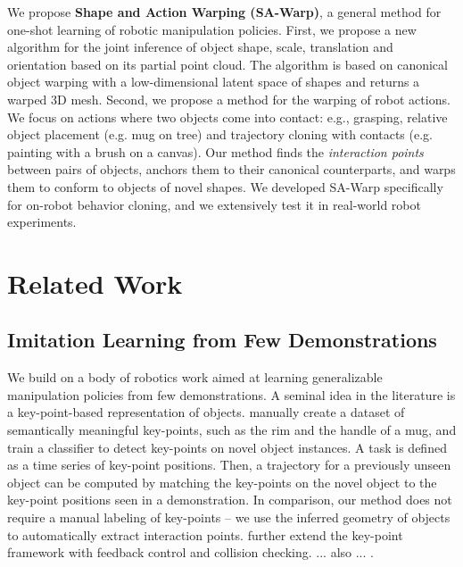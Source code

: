 \documentclass{article}
\begin{document}
We propose \textbf{Shape and Action Warping (SA-Warp)}, a general method for one-shot learning of robotic manipulation policies. First, we propose a new algorithm for the joint inference of object shape, scale, translation and orientation based on its partial point cloud. The algorithm is based on canonical object warping with a low-dimensional latent space of shapes \cite{rodriguez18transferring,thompson21shapebased} and returns a warped 3D mesh. Second, we propose a method for the warping of robot actions. We focus on actions where two objects come into contact: e.g., grasping, relative object placement (e.g. mug on tree) and trajectory cloning with contacts (e.g. painting with a brush on a canvas). Our method finds the \textit{interaction points} between pairs of objects, anchors them to their canonical counterparts, and warps them to conform to objects of novel shapes. We developed SA-Warp specifically for on-robot behavior cloning, and we extensively test it in real-world robot experiments.

\section{Related Work}

\subsection{Imitation Learning from Few Demonstrations} 

We build on a body of robotics work aimed at learning generalizable manipulation policies from few demonstrations. A seminal idea in the literature is a key-point-based representation of objects. \citet{manuelli19kpam} manually create a dataset of semantically meaningful key-points, such as the rim and the handle of a mug, and train a classifier to detect key-points on novel object instances. A task is defined as a time series of key-point positions. Then, a trajectory for a previously unseen object can be computed by matching the key-points on the novel object to the key-point positions seen in a demonstration. In comparison, our method does not require a manual labeling of key-points -- we use the inferred geometry of objects to automatically extract interaction points. \citet{gao21kpam,gao21kpamsc} further extend the key-point framework with feedback control and collision checking. ... also ... \cite{1910,vecerik20s3k,manuelli20keypoints,turpin21gift}.
\end{document}
